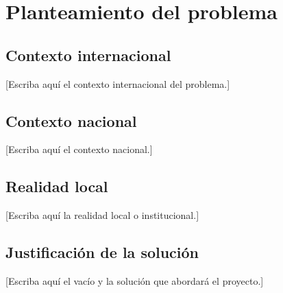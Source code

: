 \section{Planteamiento del problema}

\subsection{Contexto internacional}
[Escriba aquí el contexto internacional del problema.]

\subsection{Contexto nacional}
[Escriba aquí el contexto nacional.]

\subsection{Realidad local}
[Escriba aquí la realidad local o institucional.]

\subsection{Justificación de la solución}
[Escriba aquí el vacío y la solución que abordará el proyecto.]
